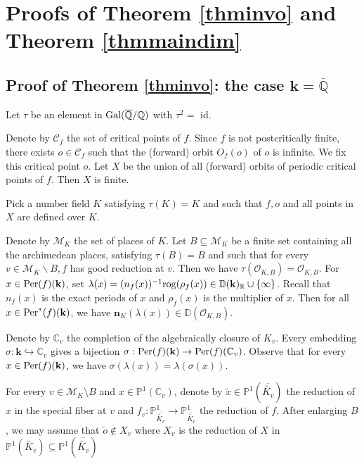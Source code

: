 \documentclass[12pt]{amsart}
\theoremstyle{plain}
\theoremstyle{remark}
\theoremstyle{definition}
\def\Q{\mathbb Q}
\def\R{\mathbb R}
\def\C{\mathbb C}
\def\D{\mathbb D}
\def\P{\mathbb P}
\def\rog{{\rm rog}}
\begin{document}
\section{Proofs of Theorem \ref{thminvo} and Theorem \ref{thmmaindim} }\label{section6}
\subsection{Proof of Theorem \ref{thminvo}: the case $\mathbf{k}=\overline{\Q}$}\label{section6.1}Let $\tau$ be an element in ${\rm Gal}(\overline{\Q}/\Q)$ with $\tau^{2}=$ id.\par
Denote by $\mathcal{C}_f$ the set of critical points of $f$. Since $f$ is not postcritically finite, there exists $o \in \mathcal{C}_f$ such that the (forward) orbit $O_{f}(o)$ of $o$ is infinite. We fix this critical point $o$. Let $X$ be the union of all (forward) orbits of periodic critical points of $f$. Then $X$ is finite.\par
Pick a number field $K$ satisfying $\tau(K)=K$ and such that $f, o$ and all points in $X$ are defined over $K$.\par
Denote by $\mathcal{M}_K$ the set of places of $K$. Let $B \subseteq \mathcal{M}_K$ be a finite set containing all the archimedean places, satisfying $\tau(B)=B$ and such that for every $v \in \mathcal{M}_K \backslash B, f$ has good reduction at $v$. Then we have $\tau(\mathcal{O}_{K, B})=\mathcal{O}_{K, B}$. For $x\in{\rm Per}(f)(\mathbf{k})$, set $\lambda(x)=(n_f(x))^{-1}\rog(\rho_f(x))\in\D(\mathbf{k})_{\R}\cup\{\infty\}$. Recall that $n_f(x)$ is the exact periods of $x$ and $\rho_f(x)$ is the multiplier of $x$.  Then for all $x \in {\rm Per}^*(f)(\mathbf{k})$, we have $\mathbf{n}_K (\lambda(x))\in \D(\mathcal{O}_{K, B})$.\par
Denote by $\C_{v}$ the completion of the algebraically closure of $K_{v}$. Every embedding $\sigma: \mathbf{k} \hookrightarrow \C_{v}$ gives a bijection $\sigma: {\rm Per}(f)(\mathbf{k}) \to {\rm Per}(f)(\C_{v})$. Observe that for every $x \in {\rm Per}(f)(\mathbf{k})$, we have $\sigma(\lambda(x))=\lambda(\sigma(x))$.\par
For every $v \in \mathcal{M}_K \setminus B$ and $x \in \P^{1}(\C_{v})$, denote by $\tilde{x} \in \P^{1}(\overline{\widetilde{K_{v}}})$ the reduction of $x$ in the special fiber at $v$ and $f_{v}: \P^{1}_{\overline{\widetilde{K_{v}}}} \to \P^{1}_{\overline{\widetilde{K_{v}}}}$ the reduction of $f$. After enlarging $B$, we may assume that $\tilde{o} \notin X_{v}$ where $X_{v}$ is the reduction of $X$ in $\P^{1}(\widetilde{K_{v}}) \subseteq \P^{1}(\overline{\widetilde{K_{v}}})$\par
\end{document}
